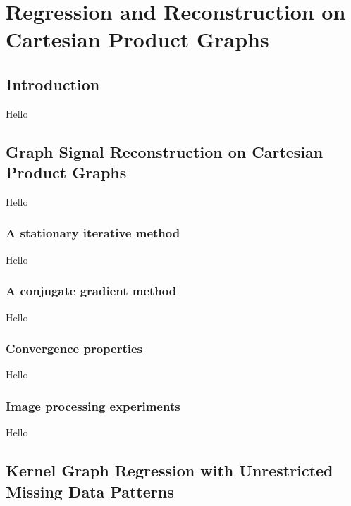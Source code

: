 \chapter{Regression and Reconstruction on Cartesian Product Graphs} 

\label{chap:reg_and_rec} 




\section{Introduction}

\label{sec:reg_and_rec_intro}

Hello



\section{Graph Signal Reconstruction on Cartesian Product Graphs}

\label{sec:gsr_cpg}

Hello

\subsection{A stationary iterative method}

Hello

\subsection{A conjugate gradient method}

Hello

\subsection{Convergence properties}

Hello

\subsection{Image processing experiments}

Hello



\section{Kernel Graph Regression with Unrestricted Missing Data Patterns}

